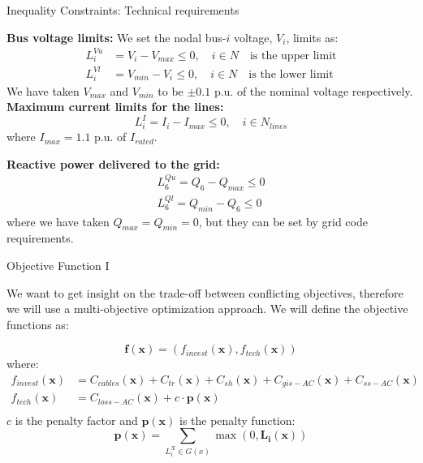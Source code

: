 \begin{frame}{Inequality Constraints: Technical requirements}


\textbf{Bus voltage limits:}
We set the nodal bus-$i$ voltage, $V_i$, limits as:
\begin{equation}
\begin{aligned}
    L_{i}^{Vu} &= V_i - V_{max} \leq 0, \quad i \in N \quad \text{is the upper limit} \\
    L_{i}^{Vl} &= V_{min} - V_i \leq 0, \quad i \in N \quad \text{is the lower limit}   
\end{aligned}    
\end{equation}
We have taken $V_{max}$ and $V_{min}$ to be $\pm 0.1$ p.u. of the nominal voltage respectively.\\

\textbf{Maximum current limits for the lines:}
\begin{equation}
    L_{i}^{I} = I_i - I_{max} \leq 0, \quad i \in N_{lines}
\end{equation}
where $I_{max} = 1.1$ p.u. of $I_{rated}$.

\textbf{Reactive power delivered to the grid:}
\begin{equation}
\begin{aligned}
    L_{6}^{Qu} = Q_6 - Q_{max} \leq 0 \\
    L_{6}^{Ql} = Q_{min} - Q_{6} \leq 0
\end{aligned}
\end{equation}
where we have taken $Q_{max}=Q_{min}=0$, but they can be set by grid code requirements.

\end{frame}

\begin{frame}{Objective Function I}

We want to get insight on the trade-off between conflicting objectives, therefore we will use a multi-objective optimization approach. We will define the objective functions as:

\begin{equation}
    \mathbf{f}(\mathbf{x}) =(f_{invest}(\mathbf{x}),f_{tech}(\mathbf{x}))
\end{equation}
where:
\begin{equation}
\begin{aligned}
    f_{invest}(\mathbf{x}) &= C_{cables}(\mathbf{x}) + C_{tr}(\mathbf{x}) + C_{sh}(\mathbf{x}) + C_{gis-AC}(\mathbf{x}) + C_{ss-AC}(\mathbf{x}) \\
    f_{tech}(\mathbf{x}) &= C_{loss-AC}(\mathbf{x}) + c \cdot \mathbf{p(x)} \\
\end{aligned}
\end{equation}
$c$ is the penalty factor and $\mathbf{p(x)}$ is the penalty function:
\begin{equation}
    \mathbf{p(x)} = \sum_{L_i^X \in G(x)} \max(0, \mathbf{L_i(x)})
\end{equation}

\end{frame}

